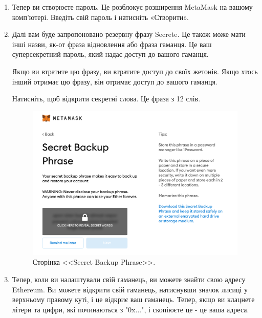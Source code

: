 \begin{enumerate}
\item Тепер ви створюєте пароль. Це розблокує розширення MetaMask на вашому комп’ютері. Введіть свій пароль і натисніть «Створити».

\item Далі вам буде запропоновано резервну фразу Secrete. Це також може мати інші назви, як-от фраза відновлення або фраза гаманця. Це ваш суперсекретний пароль, який надає доступ до вашого гаманця.

Якщо ви втратите цю фразу, ви втратите доступ до своїх жетонів. Якщо хтось інший отримає цю фразу, він отримає доступ до вашого гаманця.

Натисніть, щоб відкрити секретні слова. Це фраза з 12 слів.

    \begin{figure}[ht]
            \centering
            \includegraphics[scale=0.5]{IMAGES/metamask9.png}
            \caption{Сторінка <<Secret Backup Phrase>>.}
            \label{fig_pacman}
    \end{figure}

\item Тепер, коли ви налаштували свій гаманець, ви можете знайти свою адресу Ethereum. Ви можете відкрити свій гаманець, натиснувши значок лисиці у верхньому правому куті, і це відкриє ваш гаманець. Тепер, якщо ви клацнете літери та цифри, які починаються з "0x...", і скопіюєте це - це ваша адреса.


\end{enumerate}
